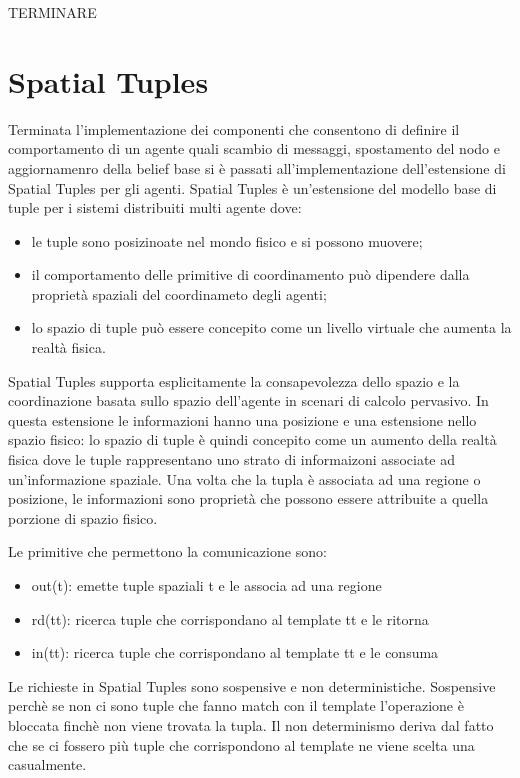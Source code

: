 \documentclass[12pt,a4paper,openright,twoside]{report}
\begin{document}
TERMINARE

\chapter{Spatial Tuples}
Terminata l'implementazione dei componenti che consentono di definire il comportamento di un agente quali scambio di messaggi, spostamento del nodo e aggiornamenro della belief base si \`e passati all'implementazione dell'estensione di Spatial Tuples per gli agenti.
Spatial Tuples \`e un'estensione del modello base di tuple per i sistemi distribuiti multi agente dove:
\begin{itemize}
   \item le tuple sono posizinoate nel mondo fisico e si possono muovere;
   \item il comportamento delle primitive di coordinamento pu\`o dipendere dalla propriet\`a spaziali del coordinameto degli agenti;
   \item lo spazio di tuple pu\`o essere concepito come un livello virtuale che aumenta la realt\`a fisica.
\end{itemize}

Spatial Tuples supporta esplicitamente la consapevolezza dello spazio e la coordinazione basata sullo spazio dell'agente in scenari di calcolo pervasivo. In questa estensione le informazioni hanno una posizione e una estensione nello spazio fisico: lo spazio di tuple \`e quindi concepito come un aumento della realt\`a fisica dove le tuple rappresentano uno strato di informaizoni associate ad un'informazione spaziale.
Una volta che la tupla \`e associata ad una regione o posizione, le informazioni sono propriet\`a che possono essere attribuite a quella porzione di spazio fisico.

Le primitive che permettono la comunicazione sono:
\begin{itemize}
   \item out(t): emette tuple spaziali t e le associa ad una regione
   \item rd(tt): ricerca tuple che corrispondano al template tt e le ritorna
   \item in(tt): ricerca tuple che corrispondano al template tt e le consuma
\end{itemize}

Le richieste in Spatial Tuples sono sospensive e non deterministiche. Sospensive perch\`e se non ci sono tuple che fanno match con il template l'operazione \`e bloccata finch\`e non viene trovata la tupla. Il non determinismo deriva dal fatto che se ci fossero pi\`u tuple che corrispondono al template ne viene scelta una casualmente.
\end{document}
